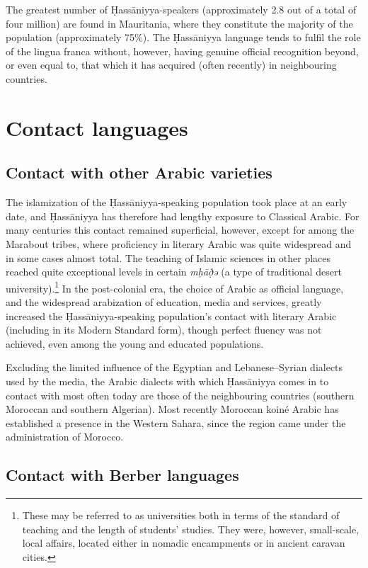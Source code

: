 \documentclass[output=paper]{langsci/langscibook}
\begin{document}
The greatest number of Ḥassāniyya-speakers (approximately 2.8 out of a total of four million) are found in Mauritania, where they constitute the majority of the population (approximately 75\%). The Ḥassāniyya language tends to fulfil the role of the lingua franca without, however, having genuine official recognition beyond, or even equal to, that which it has acquired (often recently) in neighbouring countries.

\section{ Contact languages} %

\subsection{ Contact with other Arabic varieties} %

The islamization of the Ḥassāniyya-speaking population took place at an early date, and Ḥassāniyya has therefore had lengthy exposure to Classical Arabic. For many centuries this contact remained superficial, however, except for among the Marabout tribes, where proficiency in literary Arabic was quite widespread and in some cases almost total. The teaching of Islamic sciences in other places reached quite exceptional levels in certain \textit{mḥāð̣ə{\R}} (a type of traditional desert university).\footnote{These may be referred to as universities both in terms of the standard of teaching and the length of students’ studies. They were, however, small-scale, local affairs, located either in nomadic encampments or in ancient caravan cities.} In the post-colonial era, the choice of Arabic as official language, and the widespread arabization of education, media and services, greatly increased the Ḥassāniyya-speaking population’s contact with literary Arabic (including in its Modern Standard form), though perfect fluency was not achieved, even among the young and educated populations. 

Excluding the limited influence of the Egyptian and Lebanese–Syrian dialects used by the media, the Arabic dialects with which Ḥassāniyya comes in to contact with most often today are those of the neighbouring countries (southern Moroccan and southern Algerian). Most recently Moroccan koiné Arabic has established a presence in the Western Sahara, since the region came under the administration of Morocco.

\subsection{ Contact with Berber languages} %
\end{document}
